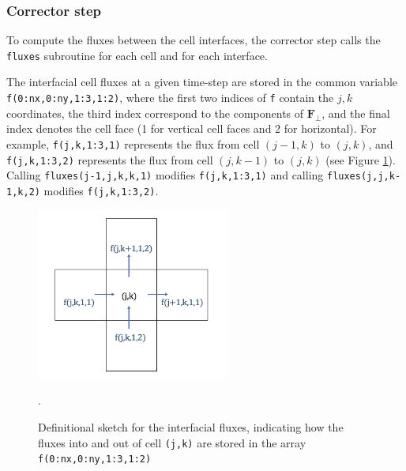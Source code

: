\documentclass{article}
\newcommand{\code}[1]{\texttt{#1}}
\begin{document}
\subsubsection*{Corrector step}

To compute the fluxes between the cell interfaces, the corrector step  calls the \code{fluxes} subroutine for each cell and for each interface. 

The interfacial cell fluxes at a given time-step are stored in the common variable \code{f(0:nx,0:ny,1:3,1:2)}, where the first two indices of \code{f} contain the $j,k$ coordinates, the third index correspond to the components of  $\mathbf{F_\perp}$, and the final index denotes the cell face (1 for vertical cell faces and 2 for horizontal).   
For example, \code{f(j,k,1:3,1)} represents the flux from cell $(j-1, k)$ to $(j, k)$, and
\code{f(j,k,1:3,2)} represents the flux from cell $(j, k-1)$ to $(j, k)$ (see Figure \ref{fluxes_specific}).
Calling \code{fluxes(j-1,j,k,k,1)} modifies \code{f(j,k,1:3,1)}  and calling \code{fluxes(j,j,k-1,k,2)} modifies \code{f(j,k,1:3,2)}.

 \begin{figure}[h]
 \centering
\includegraphics[width=15pc]{grid/fluxes_specific.png}
 \caption{Definitional sketch for the interfacial fluxes, indicating how the fluxes into and out of cell \code{(j,k)} are stored in the array \code{f(0:nx,0:ny,1:3,1:2)}}.
 \label{fluxes_specific}
 \end{figure}
\end{document}
